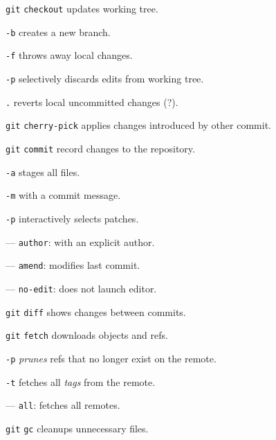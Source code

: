 \documentclass{reference_card}
\begin{document}
\begin{multicols*}{3}
\begin{compactenum}
\item [\texttt{git}] \texttt{checkout} updates working tree.
\item [\texttt{-b}] creates a new branch.
\item [\texttt{-f}] throws away local changes.
\item [\texttt{-p}] selectively discards edits from working tree.
\item [\texttt{.}] reverts local uncommitted changes (?).
\end{compactenum}

\begin{compactenum}
\item [\texttt{git}] \texttt{cherry-pick} applies changes introduced by other commit.
\end{compactenum}

\begin{compactenum}
\item [\texttt{git}] \texttt{commit} record changes to the repository.
\item [\texttt{-a}] stages all files.
\item [\texttt{-m}] with a commit message.
\item [\texttt{-p}] interactively selects patches.
\item [---] \texttt{author}: with an explicit author.
\item [---] \texttt{amend}: modifies last commit.
\item [---] \texttt{no-edit}: does not launch editor.
\end{compactenum}

\begin{compactenum}
\item [\texttt{git}] \texttt{diff} shows changes between commits.
\end{compactenum}

\begin{compactenum}
\item [\texttt{git}] \texttt{fetch} downloads objects and refs.
\item [\texttt{-p}] \emph{prunes} refs that no longer exist on the remote.
\item [\texttt{-t}] fetches all \emph{tags} from the remote.
\item [---] \texttt{all}: fetches all remotes.
\end{compactenum}

\begin{compactenum}
\item [\texttt{git}] \texttt{gc} cleanups unnecessary files.
\end{compactenum}


\end{multicols*}
\end{document}
